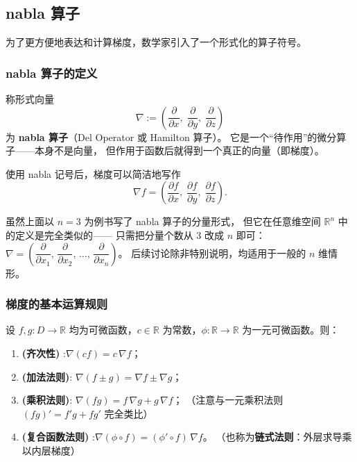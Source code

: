 \documentclass[lang=cn,11pt]{elegantbook}
\begin{document}
\subsection{nabla 算子}

为了更方便地表达和计算梯度，数学家引入了一个形式化的算子符号。

\subsubsection*{nabla 算子的定义}

\begin{definition} \label{def:nabla-operator}
称形式向量
\[
\nabla:=\left(\frac{\partial}{\partial x},\;
               \frac{\partial}{\partial y},\;
               \frac{\partial}{\partial z}\right)
\]
为 \textbf{nabla 算子}（Del Operator 或 Hamilton 算子）。
它是一个“待作用”的微分算子——本身不是向量，
但作用于函数后就得到一个真正的向量（即梯度）。
\end{definition}

使用 nabla 记号后，梯度可以简洁地写作
\[
\nabla f=\left(\frac{\partial f}{\partial x},\;
                \frac{\partial f}{\partial y},\;
                \frac{\partial f}{\partial z}\right).
\]

\begin{note}[关于维数的说明]
虽然上面以 $n=3$ 为例书写了 nabla 算子的分量形式，
但它在任意维空间 $\mathbb R^n$ 中的定义是完全类似的——
只需把分量个数从 $3$ 改成 $n$ 即可：
$\displaystyle\nabla=\left(\dfrac{\partial}{\partial x_1},\,
                 \dfrac{\partial}{\partial x_2},\,
                 \dots,\,
                 \dfrac{\partial}{\partial x_n}\right)$。
后续讨论除非特别说明，均适用于一般的 $n$ 维情形。
\end{note}


\subsubsection*{梯度的基本运算规则}

\begin{property}[梯度的代数运算法则] \label{property:gradient-algebra}
设 $f,g:D\to\mathbb R$ 均为可微函数，$c\in\mathbb R$ 为常数，$\phi:\mathbb R\to\mathbb R$
为一元可微函数。则：
\begin{enumerate}
  \item\textbf{(齐次性)} :$\nabla(cf)=c\,\nabla f$；
  \item\textbf{(加法法则)}: $\nabla(f\pm g)=\nabla f\pm \nabla g$；
  \item\textbf{(乘积法则)}: $\nabla(fg)=f\,\nabla g+g\,\nabla f$；
        （注意与一元乘积法则 $(fg)'=f'g+fg'$ 完全类比）
  \item\textbf{(复合函数法则)} :$\nabla(\phi\circ f)=(\phi'\circ f)\,\nabla f$。
        （也称为\textbf{链式法则}：外层求导乘以内层梯度）
\end{enumerate}
\end{property}
\end{document}
